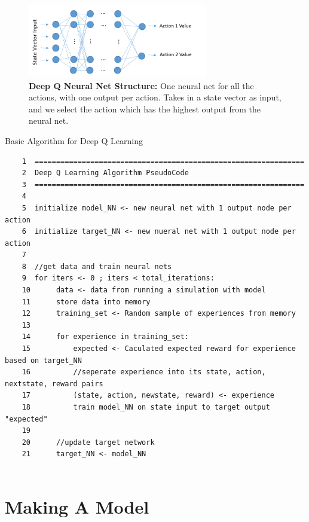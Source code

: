\documentclass[onecolumn,letterpaper,11pt]{article}
\begin{document}
\begin{figure}[H]
	\centering 
	\includegraphics[width=0.7\textwidth]{../Images/deepQNet.png}
	\caption{{\bf Deep Q Neural Net Structure:} One neural net for all the actions, with one output per action. Takes in a state vector as input, and we select the action which has the highest output from the neural net.}
	\label{fig_deep_q_net}
\end{figure}

\vspace{0.15in}
\begin{listing}{Basic Algorithm for Deep Q Learning}
	\label{lst_uSpeechRec_econfig}
	\footnotesize
	\begin{verbatim}
	1  =============================================================== 
	2  Deep Q Learning Algorithm PseudoCode                   
	3  =============================================================== 
	4                                                                  
	5  initialize model_NN <- new neural net with 1 output node per action
	6  initialize target_NN <- new nueral net with 1 output node per action
	7	
	8  //get data and train neural nets
	9  for iters <- 0 ; iters < total_iterations:
	10      data <- data from running a simulation with model 
	11      store data into memory
	12      training_set <- Random sample of experiences from memory
	13
	14      for experience in training_set: 
	15          expected <- Caculated expected reward for experience based on target_NN
	16          //seperate experience into its state, action, nextstate, reward pairs
	17          (state, action, newstate, reward) <- experience
	18          train model_NN on state input to target output "expected"
	19 
	20      //update target network
	21      target_NN <- model_NN   
	                                                     
	\end{verbatim}
	\normalsize
\end{listing}


\section{Making A Model}
\end{document}

